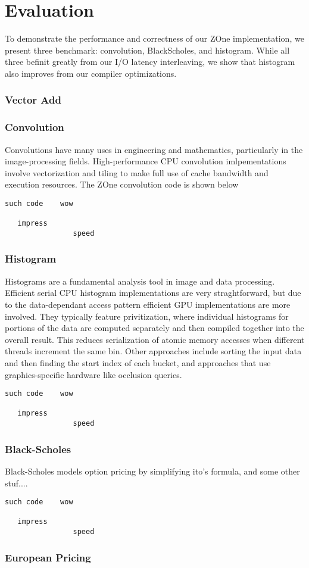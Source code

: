 \section{Evaluation}

To demonstrate the performance and correctness of our ZOne implementation, we
present three benchmark: convolution, BlackScholes, and histogram.
While all three befinit greatly from our I/O latency interleaving, we show
	that histogram also improves from our compiler optimizations.


\subsubsection{Vector Add}

\subsubsection{Convolution}
Convolutions have many uses in engineering and mathematics, particularly in
the image-processing fields. High-performance CPU convolution imlpementations
involve vectorization and tiling to make full use of cache bandwidth and 
execution resources. The ZOne convolution code is shown below

\begin{verbatim}
such code    wow

   impress
                speed
\end{verbatim}


\subsubsection{Histogram}
Histograms are a fundamental analysis tool in image and data processing.
Efficient serial CPU histogram implementations are very straghtforward, but
due to the data-dependant access pattern efficient GPU implementations are
more involved. They typically feature privitization,
where individual histograms for portions of the data are computed separately
and then compiled together into the overall result. This reduces serialization
of atomic memory accesses when different threads increment the same bin.
Other approaches include sorting the input data and then finding the start
index of each bucket, and approaches that use graphics-specific hardware like
occlusion queries.

\begin{verbatim}
such code    wow

   impress
                speed
\end{verbatim}


\subsubsection{Black-Scholes}
Black-Scholes models option pricing by simplifying ito's formula, and some other stuf....


\begin{verbatim}
such code    wow

   impress
                speed
\end{verbatim}


\subsubsection{European Pricing}

